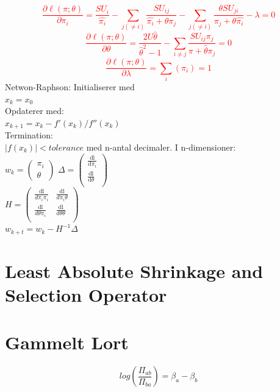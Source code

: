 \documentclass[11pt,a4paper]{article}
\begin{document}
\textcolor{red}{
\begin{equation}
\frac{\partial \ell(\pi;\theta)}{\partial \pi_i}= 
\frac{SU_i}{\hat{\pi_i}}-\sum_{j(\neq i)}\frac{SU_{ij}}{\hat{\pi_i}+\theta \pi_j}-\sum_{j(\neq i)}\frac{\theta SU_{ji}}{\pi_j + \theta \hat{\pi_i}}-\lambda=0
\end{equation}
\begin{equation}
\frac{\partial \ell(\pi;\theta)}{\partial \theta}=
\frac{2U\hat{\theta}}{\hat{\theta}^2-1}-\sum_{i \neq j}\frac{SU_{ij}\pi_j}{\pi+\hat{\theta}\pi_j}=0
\end{equation}
\begin{equation}
\frac{\partial \ell(\pi;\theta)}{\partial \lambda}=\sum_i(\pi_i)=1
\end{equation}
}
Netwon-Raphson:
Initialiserer med\\ $x_{k} = x_0$\\
Opdaterer med:\\
$x_{k+1}=x_{k}-f'(x_{k})/f''(x_{k})$\\
Termination:\\
$|f(x_{k})|< tolerance$ med n-antal decimaler.
I n-dimensioner:\\
$
w_{k} = \left(
\begin{array}{c}
\pi_i\\
\theta
\end{array}
\right) 
$
$
\Delta=\left(
\begin{array}{c}
 \frac{\text{dl}}{\text{d$\pi $}_i} \\
 \frac{\text{dl}}{\text{d$\theta $}} \\
\end{array}
\right)
$
\\
$
H=\left(
\begin{array}{cc}
 \frac{\text{dl}}{d \pi _i \pi _i} & \frac{\text{dl}}{d   \pi _i \theta} \\
 \frac{\text{dl}}{d \theta  \pi _i} & \frac{\text{dl}}{d \theta \theta } \\
\end{array}
\right)
$
\\
$
w_{k+t}=w_k-H^{-1}\Delta
$
\section{Least Absolute Shrinkage and Selection Operator}

\section{Gammelt Lort}
\begin{equation}
log(\frac{\Pi_{ab}}{\Pi_{ba}}) = \beta_a-\beta_b
\end{equation}
\end{document}
